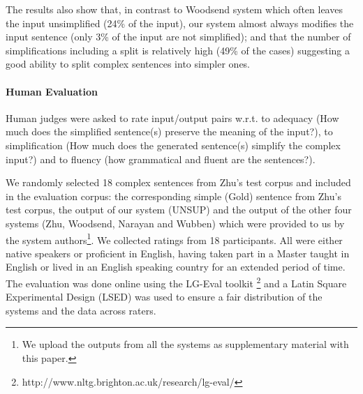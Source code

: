 \documentclass[11pt,a4paper]{article}
\begin{document}
The results also show that, in contrast to Woodsend system which often
leaves the input unsimplified (24\% of the input), our system almost
always modifies the input sentence (only 3\% of the input are not
simplified); and that the number of simplifications including a split
is relatively high (49\% of the cases) suggesting a good ability to
split complex sentences into simpler ones.






















\paragraph{Human Evaluation}
Human judges were asked to rate input/output pairs w.r.t. to adequacy
(How much does the simplified sentence(s) preserve the meaning of the
input?), to simplification (How much does the generated sentence(s)
simplify the complex input?) and to fluency (how grammatical and
fluent are the sentences?).

We randomly selected 18 complex sentences from Zhu's test corpus and
included in the evaluation corpus: the corresponding simple (Gold)
sentence from Zhu's test corpus, the output of our system (UNSUP) and
the output of the other four systems (Zhu, Woodsend, Narayan and
Wubben) which were provided to us by the system authors\footnote{We
  upload the outputs from all the systems as supplementary material
  with this paper.}.  We collected ratings from 18 participants. All
were either native speakers or proficient in English, having taken
part in a Master taught in English or lived in an English speaking
country for an extended period of time.  The evaluation was done
online using the LG-Eval toolkit
\cite{kow2012lg}\footnote{http://www.nltg.brighton.ac.uk/research/lg-eval/}
and a Latin Square Experimental Design (LSED) was used to ensure a
fair distribution of the systems and the data across raters.
\end{document}
